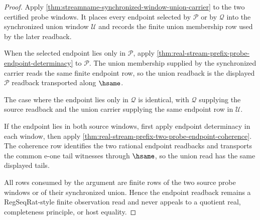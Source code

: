 \begin{proof}
Apply \autoref{thm:streamname-synchronized-window-union-carrier} to the two
certified probe windows. It places every endpoint selected by $\mathcal P$ or
by $\mathcal Q$ into the synchronized union window $\mathcal U$ and records the
finite union membership row used by the later readback.

When the selected endpoint lies only in $\mathcal P$, apply
\autoref{thm:real-stream-prefix-probe-endpoint-determinacy} to
$\mathcal P$. The union membership supplied by the synchronized carrier reads
the same finite endpoint row, so the union readback is the displayed
$\mathcal P$ readback transported along $\hsame$.

The case where the endpoint lies only in $\mathcal Q$ is identical, with
$\mathcal Q$ supplying the source readback and the union carrier supplying the
same endpoint row in $\mathcal U$.

If the endpoint lies in both source windows, first apply endpoint determinacy
in each window, then apply
\autoref{thm:real-stream-prefix-two-probe-endpoint-coherence}. The coherence
row identifies the two rational endpoint readbacks and transports the common
e-one tail witnesses through $\hsame$, so the union read has the same displayed
tails.

All rows consumed by the argument are finite rows of the two source probe
windows or of their synchronized union. Hence the endpoint readback remains a
RegSeqRat-style finite observation read and never appeals to a quotient real,
completeness principle, or host equality.
\end{proof}

